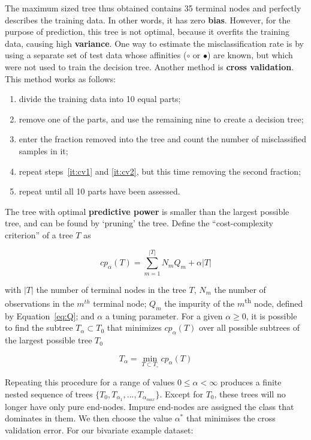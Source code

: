 The maximum sized tree thus obtained contains 35 terminal nodes and
perfectly describes the training data.  In other words, it has zero
\textbf{bias}.  However, for the purpose of prediction, this tree is
not optimal, because it overfits the training data, causing high
\textbf{variance}. One way to estimate the misclassification rate is
by using a separate set of test data whose affinities ($\circ$ or
$\bullet$) are known, but which were not used to train the decision
tree. Another method is \textbf{cross validation}. This method works
as follows:

\begin{enumerate}
\item divide the training data into 10 equal parts;
\item\label{it:cv1} remove one of the parts, and use the remaining
  nine to create a decision tree;
\item\label{it:cv2} enter the fraction removed into the tree and count
  the number of misclassified samples in it;
\item repeat steps~\ref{it:cv1} and \ref{it:cv2}, but this time
  removing the second fraction;
\item repeat until all 10 parts have been assessed.
\end{enumerate}

The tree with optimal \textbf{predictive power} is smaller than the
largest possible tree, and can be found by `pruning' the tree. Define
the ``cost-complexity criterion'' of a tree $T$ as

\begin{equation}
  \label{eq:cp}
  cp_{\alpha}(T) = \sum_{m=1}^{|T|} N_m Q_m + \alpha|T|
\end{equation}

with $|T|$ the number of terminal nodes in the tree $T$, $N_m$ the
number of observations in the $m^{th}$ terminal node; $Q_m$ the
impurity of the $m$\textsuperscript{th} node, defined by
Equation~\ref{eq:Q}; and $\alpha$ a tuning parameter.  For a given
$\alpha \geq 0$, it is possible to find the subtree $T_{\alpha}
\subset T_0$ that minimizes $cp_{\alpha}(T)$ over all possible
subtrees of the largest possible tree $T_0$

\begin{equation}
  \label{eq:Ta}
  T_{\alpha} = \underset{T \subset T_\circ}{\min} cp_{\alpha}(T)
\end{equation}

Repeating this procedure for a range of values $0 \leq \alpha <
\infty$ produces a finite nested sequence of trees
$\{T_0,T_{\alpha_1},...,T_{\alpha_{max}}\}$.  Except for $T_0$, these
trees will no longer have only pure end-nodes. Impure end-nodes are
assigned the class that dominates in them.  We then choose the value
$\alpha^*$ that minimises the cross validation error. For our
bivariate example dataset:

